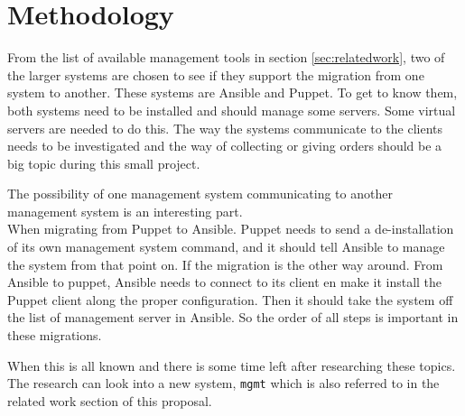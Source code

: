 \section{Methodology}\label{sec:method}
From the list of available management tools in section \ref{sec:relatedwork}, two of the larger systems are chosen to see if they support the migration from one system to another. These systems are Ansible\cite{whatisansible} and Puppet\cite{whatispuppet}. To get to know them, both systems need to be installed and should manage some servers. Some virtual servers are needed to do this. The way the systems communicate to the clients needs to be investigated and the way of collecting or giving orders should be a big topic during this small project. 

The possibility of one management system communicating to another management system is an interesting part. \\
When migrating from Puppet to Ansible. Puppet needs to send a de-installation of its own management system command, and it should tell Ansible to manage the system from that point on. If the migration is the other way around. From Ansible to puppet, Ansible needs to connect to its client en make it install the Puppet client along the proper configuration. Then it should take the system off the list of management server in Ansible. So the order of all steps is important in these migrations. 

When this is all known and there is some time left after researching these topics. The research can look into a new system, \texttt{mgmt} which is also referred to in the related work section of this proposal.

